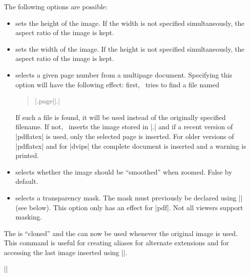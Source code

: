\begin{command}{\pgfdeclareimage{}}
    The following options are possible:
    \begin{itemize}
        \item {} sets the height of the image.
            If the width is not specified simultaneously, the aspect ratio of
            the image is kept.
        \item {} sets the width of the image.
            If the height is not specified simultaneously, the aspect ratio of
            the image is kept.
        \item {} selects a given page number
            from a multipage document. Specifying this option will have the
            following effect: first, \pgfname\ tries to find a file named
            \begin{quote}
                |.page||.|
            \end{quote}
            If such a file is found, it will be used instead of the originally
            specified filename. If not, \pgfname\ inserts the image stored in
            |.| and if a recent version of
            |pdflatex| is used, only the selected page is inserted. For older
            versions of |pdflatex| and for |dvips| the complete document is
            inserted and a warning is printed.
        \item {} selects whether the
            image should be ``smoothed'' when zoomed. False by default.
        \item {} selects a transparency mask.
            The mask must previously be declared using |\pgfdeclaremask| (see
            below). This option only has an effect for |pdf|. Not all viewers
            support masking.
    \end{itemize}
\begin{codeexample}
\end{codeexample}
\end{command}

\begin{command}{\pgfaliasimage{}}
    The  is ``cloned'' and the 
    can now be used whenever the original image is used. This command is useful
    for creating aliases for alternate extensions and for accessing the last
    image inserted using |\pgfimage|.

    \example ||
\end{command}


